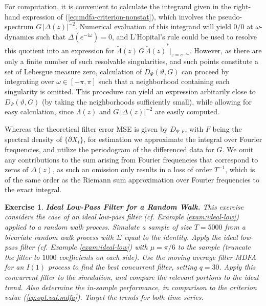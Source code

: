 \documentclass[a4paper]{book}
\newtheorem{Exercise}{Exercise}
\begin{document}
 For computation, it is convenient to calculate the integrand given in the
  right-hand expression of (\ref{eq:mdfa-criterion-nonstat}), which involves
   the pseudo-spectrum $ G \, {|\Delta (z) |}^{-2}$.  Numerical
    evaluation of this integrand will yield $0/0$ at $\omega$-dynamics such
  that $\Delta (e^{-i \omega}) = 0$, and L'Hopital's rule could be used
  to resolve this quotient into an expression for
  $\widetilde{\Lambda} (z)   \,  G \, 
  {\widetilde{\Lambda} (z) }^* \vert_{z= e^{-i \omega}}$.
  However, as there are only a finite number of such resolvable singularities,
   and such points constitute a set of   Lebesgue measure zero, 
   calculation of $D_{\Psi} (\vartheta, G)$ can proceed by 
   integrating over $\omega \in [-\pi, \pi]$ such that a neighborhood containing
    each singularity is omitted.  This procedure can yield an expression arbitarily
     close to $D_{\Psi} (\vartheta, G)$ (by taking the neighborhoods sufficiently small),
    while allowing for easy calculation, since $\Lambda (z)$ and 
    $ G \, {|\Delta (z) |}^{-2}$ are easily computed.  
   
   
  Whereas the theoretical filter error MSE is given by $D_{\Psi, F}$, 
  with $F$ being the spectral density of $\{ \partial X_t \}$,
 for estimation we approximate the integral over Fourier frequencies, 
 and utilize the periodogram of the differenced data for $G$.
 We omit any contributions to the sum arising from Fourier frequencies
 that correspond to zeros of $\Delta (z)$, as such an omission
 only results in a loss of order $T^{-1}$, which is of the same order
 as the Riemann sum approximation over Fourier frequencies to the exact integral.


\begin{Exercise} {\bf  Ideal Low-Pass Filter for a Random Walk.} \rm
\label{exer:rwtrend-mdfa}
This exercise considers the case of an ideal low-pass filter
 (cf. Example \ref{exam:ideal-low}) 
 applied to a random walk process.
 Simulate a sample of size $T=5000$ from a
  bivariate random walk process with 
  $\Sigma$ equal to the identity.  
      Apply the   ideal low-pass filter (cf. Example \ref{exam:ideal-low}) with 
  $\mu = \pi/6$ to the sample (truncate the filter to $1000$ coefficients on each side).  
 Use the moving average filter  MDFA  for an $I(1)$ process  to find the best
 concurrent filter, setting $q= 30$. 
   Apply this concurrent filter 
 to the simulation, and compare the relevant portions to the ideal trend.
 Also determine the in-sample performance, in comparison to the criterion value
 (\ref{eq:opt.val.mdfa}).   Target the trends for both time series.
\end{Exercise}
\end{document}
